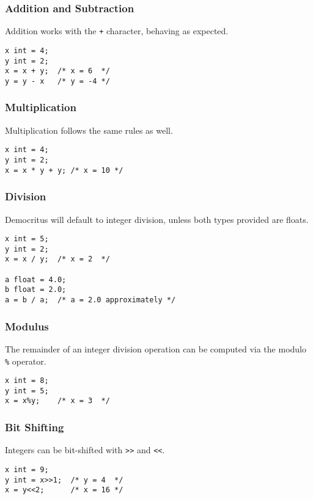		\subsubsection{Addition and Subtraction}
			Addition works with the \texttt{+} character, behaving as expected.
			\begin{lstlisting}
x int = 4;
y int = 2;
x = x + y; 	/* x = 6  */
y = y - x 	/* y = -4 */
			\end{lstlisting}
						
		\subsubsection{Multiplication}
			Multiplication follows the same rules as well. 
			\begin{lstlisting}
x int = 4;
y int = 2;
x = x * y + y; /* x = 10 */
			\end{lstlisting}
			

		\subsubsection{Division}
			Democritus will default to integer division, unless both types provided are floats. 
			\begin{lstlisting}
x int = 5;
y int = 2;
x = x / y; 	/* x = 2  */

a float = 4.0;
b float = 2.0;
a = b / a; 	/* a = 2.0 approximately */
			\end{lstlisting}

        \subsubsection{Modulus}
            The remainder of an integer division operation can be computed via the modulo \texttt{\%} operator.
            \begin{lstlisting}
x int = 8;
y int = 5;
x = x%y; 	/* x = 3  */
			\end{lstlisting}
	
		\subsubsection{Bit Shifting}
			Integers can be bit-shifted with \texttt{\textgreater\textgreater} and \texttt{\textless\textless}.
			\begin{lstlisting}
x int = 9;
y int = x>>1;  /* y = 4  */
x = y<<2; 	   /* x = 16 */
			\end{lstlisting}
		
